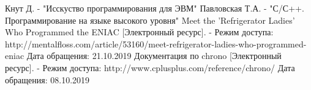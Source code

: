 \newpage
{}

\begin{thebibliography}{}
     Кнут Д. - "Исскуство программирования для ЭВМ"
     Павловская Т.А. - "С/С++. Программирование на языке высокого уровня"
     Meet the 'Refrigerator Ladies' Who Programmed the ENIAC [Электронный ресурс]. - Режим доступа: http://mentalfloss.com/article/53160/meet-refrigerator-ladies-who-programmed-eniac Дата обращения: 21.10.2019
     Документация по chrono [Электронный ресурс]. -  Режим доступа: http://www.cplusplus.com/reference/chrono/ Дата обращения: 08.10.2019
\end{thebibliography}
